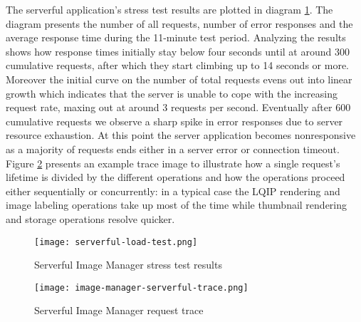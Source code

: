 The serverful application's stress test results are plotted in diagram \ref{fig:serverfulStressTest}. The diagram presents the number of all requests, number of error responses and the average response time during the 11-minute test period. Analyzing the results shows how response times initially stay below four seconds until at around 300 cumulative requests, after which they start climbing up to 14 seconds or more. Moreover the initial curve on the number of total requests evens out into linear growth which indicates that the server is unable to cope with the increasing request rate, maxing out at around 3 requests per second. Eventually after 600 cumulative requests we observe a sharp spike in error responses due to server resource exhaustion. At this point the server application becomes nonresponsive as a majority of requests ends either in a server error or connection timeout. Figure \ref{fig:serverfulTrace} presents an example trace image to illustrate how a single request's lifetime is divided by the different operations and how the operations proceed either sequentially or concurrently: in a typical case the LQIP rendering and image labeling operations take up most of the time while thumbnail rendering and storage operations resolve quicker.

\begin{figure}[h]
  \centering
  \texttt{[image: serverful-load-test.png]}
  \caption{Serverful Image Manager stress test results}
  \label{fig:serverfulStressTest}
\end{figure}

\begin{figure}[h]
  \centering
  \texttt{[image: image-manager-serverful-trace.png]}
  \caption{Serverful Image Manager request trace}
  \label{fig:serverfulTrace}
\end{figure}

